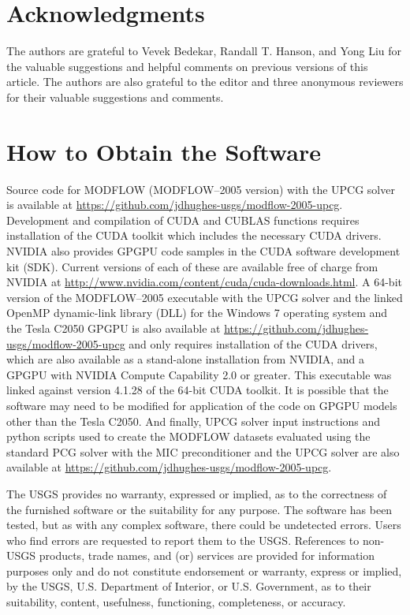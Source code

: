 \documentclass[12pt]{article}
\begin{document}
\section* {\bf Acknowledgments}

The authors are grateful to Vevek Bedekar, Randall T. Hanson, and Yong Liu for the valuable suggestions and helpful comments on previous versions of this article. The authors are also grateful to the editor and three anonymous reviewers for their valuable suggestions and comments.


\color{blue}
\section* {\bf How to Obtain the Software}

Source code for MODFLOW (MODFLOW--2005 version) with the UPCG solver is available at \url{https://github.com/jdhughes-usgs/modflow-2005-upcg}. Development and compilation of CUDA and CUBLAS functions requires installation of the CUDA toolkit which includes the necessary CUDA drivers. NVIDIA also provides GPGPU code samples in the CUDA software development kit (SDK). Current versions of each of these are available free of charge from NVIDIA at \url{http://www.nvidia.com/content/cuda/cuda-downloads.html}. A 64-bit version of the MODFLOW--2005 executable with the UPCG solver and the linked OpenMP dynamic-link library (DLL) for the Windows 7 operating system and the Tesla C2050 GPGPU is also available at \url{https://github.com/jdhughes-usgs/modflow-2005-upcg} and only requires installation of the CUDA drivers, which are also available as a stand-alone installation from NVIDIA, and a GPGPU with NVIDIA Compute Capability 2.0 or greater. This executable was linked against version 4.1.28 of the 64-bit CUDA toolkit. It is possible that the software may need to be modified for application of the code on GPGPU models other than the Tesla C2050. And finally, UPCG solver input instructions and python scripts used to create the MODFLOW datasets evaluated using the standard PCG solver with the MIC preconditioner and the UPCG solver are also available at \url{https://github.com/jdhughes-usgs/modflow-2005-upcg}.

The USGS provides no warranty, expressed or implied, as to the correctness of the furnished software or the suitability for any purpose. The software has been tested, but as with any complex software, there could be undetected errors. Users who find errors are requested to report them to the USGS. References to non-USGS products, trade names, and (or) services are provided for information purposes only and do not constitute endorsement or warranty, express or implied, by the USGS, U.S. Department of Interior, or U.S. Government, as to their suitability, content, usefulness, functioning, completeness, or accuracy.\color{black}  
\end{document}
